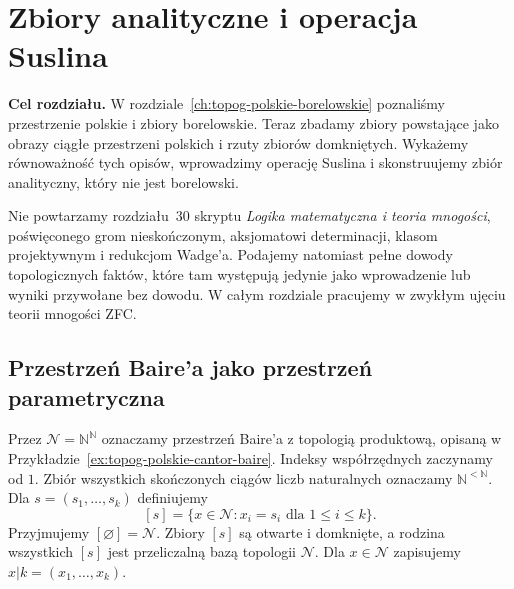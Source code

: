 \chapter{Zbiory analityczne i operacja Suslina}
\label{ch:topog-analityczne-suslin}

\noindent\textbf{Cel rozdziału.}
W rozdziale~\ref{ch:topog-polskie-borelowskie}
poznaliśmy przestrzenie polskie i zbiory borelowskie.
Teraz zbadamy zbiory powstające jako obrazy ciągłe
przestrzeni polskich i rzuty zbiorów domkniętych.
Wykażemy równoważność tych opisów, wprowadzimy
operację Suslina i skonstruujemy zbiór analityczny,
który nie jest borelowski.

Nie powtarzamy rozdziału~30 skryptu
\emph{Logika matematyczna i teoria mnogości},
poświęconego grom nieskończonym, aksjomatowi
determinacji, klasom projektywnym i redukcjom Wadge'a.
Podajemy natomiast pełne dowody topologicznych
faktów, które tam występują jedynie jako
wprowadzenie lub wyniki przywołane bez dowodu.
W całym rozdziale pracujemy w zwykłym
ujęciu teorii mnogości ZFC.

\section{Przestrzeń Baire'a jako przestrzeń parametryczna}
\label{sec:topog20-baire}

Przez \(\mathcal N=\mathbb N^{\mathbb N}\)
oznaczamy przestrzeń Baire'a z topologią
produktową, opisaną w
Przykładzie~\ref{ex:topog-polskie-cantor-baire}.
Indeksy współrzędnych zaczynamy od \(1\).
Zbiór wszystkich skończonych ciągów
liczb naturalnych oznaczamy
\(\mathbb N^{<\mathbb N}\).
Dla \(s=(s_1,\ldots,s_k)\) definiujemy
\[
 [s]=\{x\in\mathcal N:
             x_i=s_i\text{ dla }1\le i\le k\}.
\]
Przyjmujemy \([\varnothing]=\mathcal N\).
Zbiory \([s]\) są otwarte i domknięte,
a rodzina wszystkich \([s]\)
jest przeliczalną bazą topologii
\(\mathcal N\).
Dla \(x\in\mathcal N\) zapisujemy
\(x|k=(x_1,\ldots,x_k)\).

